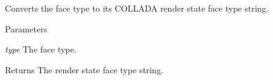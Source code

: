 \label{namespaceFUDaePassStateFaceType_a783649a9ba7bc1f3216fca293e271269}
Converts the face type to its COLLADA render state face type string. 
\begin{DoxyParams}{Parameters}
\item[{\em type}]The face type. \end{DoxyParams}
\begin{DoxyReturn}{Returns}
The render state face type string. 
\end{DoxyReturn}
